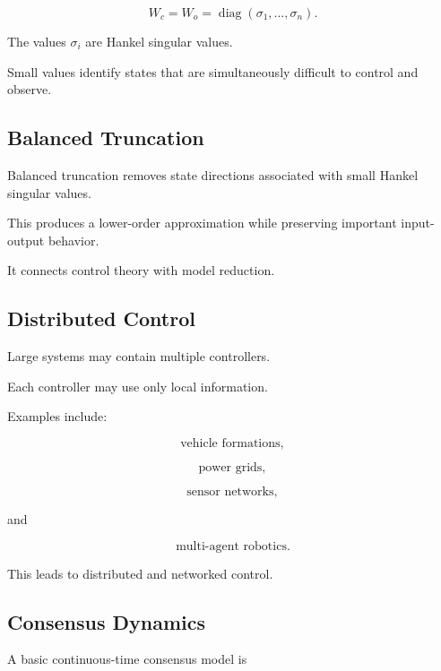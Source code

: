 \[
\boxed{
W_c
=
W_o
=
\operatorname{diag}
(\sigma_1,\ldots,\sigma_n).
}
\]

The values \(\sigma_i\) are Hankel singular values.

Small values identify states that are simultaneously difficult to control
and observe.

\subsection{Balanced Truncation}
\label{subsec:balanced-truncation}

Balanced truncation removes state directions associated with small Hankel
singular values.

This produces a lower-order approximation while preserving important
input-output behavior.

It connects control theory with model reduction.

\subsection{Distributed Control}
\label{subsec:distributed-control}

Large systems may contain multiple controllers.

Each controller may use only local information.

Examples include:

\[
\boxed{
\text{vehicle formations},
}
\]

\[
\boxed{
\text{power grids},
}
\]

\[
\boxed{
\text{sensor networks},
}
\]

and

\[
\boxed{
\text{multi-agent robotics}.
}
\]

This leads to distributed and networked control.

\subsection{Consensus Dynamics}
\label{subsec:consensus-dynamics}

A basic continuous-time consensus model is

